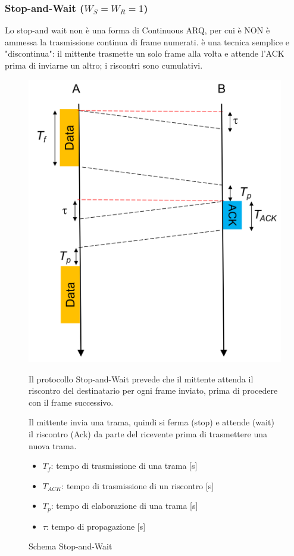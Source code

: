 \newpage
\subsubsection{Stop-and-Wait ($W_S = W_R = 1$)}
Lo stop-and wait non è una forma di Continuous ARQ, per cui è NON è ammessa la trasmissione continua di frame numerati.
è una tecnica semplice e "discontinua": il mittente trasmette un solo frame alla volta e attende l'ACK prima di inviarne un altro; i riscontri sono cumulativi.
\begin{figure}[htbp]
    \centering
    \begin{minipage}{0.4\textwidth}
        \includegraphics[width=\linewidth]{images/stopwait.png}
        \caption{Schema Stop-and-Wait}
    \end{minipage}%
    \hfill
    \begin{minipage}{0.55\textwidth}
        Il protocollo Stop-and-Wait prevede che il mittente attenda il riscontro del destinatario per ogni frame inviato, prima di procedere con il frame successivo.

        Il mittente invia una trama, quindi si ferma (stop) e attende (wait) il riscontro (Ack) da parte del ricevente prima di trasmettere una nuova trama.
\begin{itemize}
    \item $T_f$: tempo di trasmissione di una trama [s]
    \item $T_{ACK}$: tempo di trasmissione di un riscontro [s]
    \item $T_p$: tempo di elaborazione di una trama [s]
    \item $\tau$: tempo di propagazione [s]
\end{itemize}
    \end{minipage}
\end{figure}

